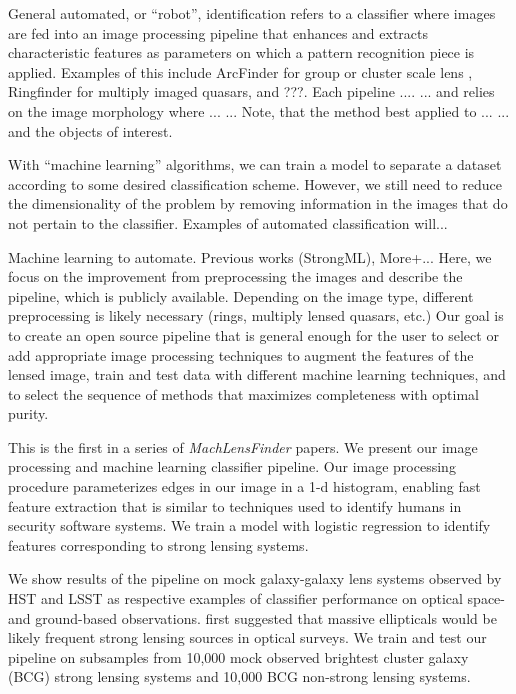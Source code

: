 \documentclass{emulateapj}
\begin{document}
General automated, or ``robot'', identification refers to a classifier
where images are fed into an image processing pipeline that enhances
and extracts characteristic features as parameters on which a pattern
recognition piece is applied.  Examples of this include ArcFinder for
group or cluster scale lens \citep{seidelandbartelmann_07}, Ringfinder
for multiply imaged quasars\citep{gavazzi_etal14}, and ???.  Each
pipeline .... ... and relies on the image morphology where ... ...
Note, that the method best applied to ... ... and the objects of
interest.

With ``machine learning'' algorithms, we can train a model to separate
a dataset according to some desired classification scheme.  However,
we still need to reduce the dimensionality of the problem by removing
information in the images that do not pertain to the classifier.
Examples of automated classification will...

Machine learning to automate.  Previous works (StrongML),
More+... Here, we focus on the improvement from preprocessing the
images and describe the pipeline, which is publicly available.
Depending on the image type, different preprocessing is likely
necessary (rings, multiply lensed quasars, etc.) Our goal is to create
an open source pipeline that is general enough for the user to select
or add appropriate image processing techniques to augment the features
of the lensed image, train and test data with different machine
learning techniques, and to select the sequence of methods that
maximizes completeness with optimal purity.

This is the first in a series of {\em MachLensFinder} papers.  We
present our image processing and machine learning classifier pipeline.
Our image processing procedure parameterizes edges in our image in a
1-d histogram, enabling fast feature extraction that is similar to
techniques used to identify humans in security software systems.  We
train a model with logistic regression to identify features
corresponding to strong lensing systems.

We show results of the pipeline on mock galaxy-galaxy lens systems
observed by HST and LSST as respective examples of classifier
performance on optical space- and ground-based observations.
\citet{miraldaescudeandlehar_92} first suggested that massive
ellipticals would be likely frequent strong lensing sources in optical
surveys.  We train and test our pipeline on subsamples from 10,000
mock observed brightest cluster galaxy (BCG) strong lensing systems
and 10,000 BCG non-strong lensing systems.
\end{document}
